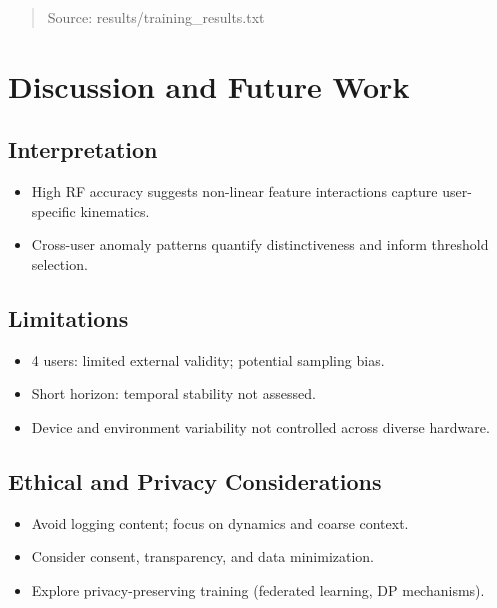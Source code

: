 \documentclass[
  12pt,
  a4paper,
]{report}
\providecommand{\tightlist}{%
  \setlength{\itemsep}{0pt}\setlength{\parskip}{0pt}}
\begin{document}
\begin{quote}
Source: results/training\_results.txt
\end{quote}

\chapter{Discussion and Future Work}\label{discussion-and-future-work}

\section{Interpretation}\label{interpretation}

\begin{itemize}
\tightlist
\item
  High RF accuracy suggests non-linear feature interactions capture
  user-specific kinematics.
\item
  Cross-user anomaly patterns quantify distinctiveness and inform
  threshold selection.
\end{itemize}

\section{Limitations}\label{limitations}

\begin{itemize}
\tightlist
\item
  4 users: limited external validity; potential sampling bias.
\item
  Short horizon: temporal stability not assessed.
\item
  Device and environment variability not controlled across diverse
  hardware.
\end{itemize}

\section{Ethical and Privacy
Considerations}\label{ethical-and-privacy-considerations}

\begin{itemize}
\tightlist
\item
  Avoid logging content; focus on dynamics and coarse context.
\item
  Consider consent, transparency, and data minimization.
\item
  Explore privacy-preserving training (federated learning, DP
  mechanisms).
\end{itemize}
\end{document}
